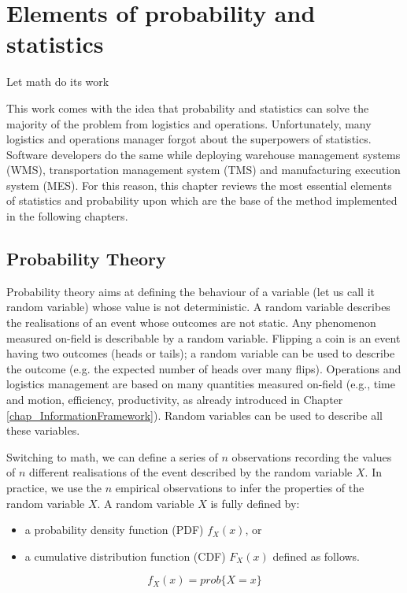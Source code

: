\chapter{Elements of probability and statistics}{Let math do its work}

This work comes with the idea that probability and statistics can solve the majority of the problem from logistics and operations. Unfortunately, many logistics and operations manager forgot about the superpowers of statistics. Software developers do the same while deploying warehouse management systems (WMS), transportation management system (TMS) and manufacturing execution system (MES). For this reason, this chapter reviews the most essential elements of statistics and probability upon which are the base of the method implemented in the following chapters. 

\section{Probability Theory}
Probability theory aims at defining the behaviour of a variable (let us call it random variable) whose value is not deterministic. A random variable describes the realisations of an event whose outcomes are not static. Any phenomenon measured on-field is describable by a random variable. Flipping a coin is an event having two outcomes (heads or tails); a random variable can be used to describe the outcome (e.g. the expected number of heads over many flips). Operations and logistics management are based on many quantities measured on-field (e.g., time and motion, efficiency, productivity, as already introduced in Chapter \ref{chap_InformationFramework}). Random variables can be used to describe all these variables. 

Switching to math, we can define a series of $n$ observations recording the values of $n$ different realisations of the event described by the random variable $X$. In practice, we use the $n$ empirical observations to infer the properties of the random variable $X$. A random variable $X$ is fully defined by:
\begin{itemize}
    \item 	a probability density function (PDF) $f_X (x)$, or
    \item 	a cumulative distribution function (CDF) $F_X (x)$ defined as follows.
\end{itemize}

\begin{equation}
f_X\left(x\right)=prob\{X=x\}
\label{eq_pdf}
\end{equation}

